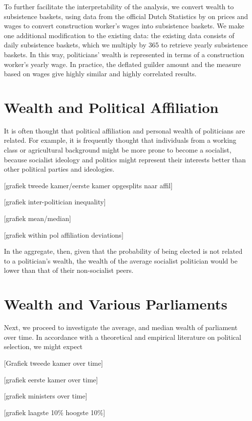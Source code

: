 To further facilitate the interpretability of the analysis, we convert wealth to subsistence baskets, using data from the official Dutch Statistics by \autocite{deZwart2015} on prices and wages to convert construction worker's wages into subsistence baskets. We make one additional modification to the existing data: the existing data consists of daily subsistence baskets, which we multiply by 365 to retrieve yearly subsistence baskets. In this way, politicians' wealth is represented in terms of a construction worker's yearly wage. In practice, the deflated guilder amount and the measure based on wages give highly similar and highly correlated results. 

\section{Wealth and Political Affiliation}
It is often thought that political affiliation and personal wealth of politicians are related. For example, it is frequently thought that individuals from a working class or agricultural background might be more prone to become a socialist, because socialist ideology and politics might represent their interests better than other political parties and ideologies. 


\begin{center}
    
    [grafiek tweede kamer/eerste kamer opgesplits naar affil]
    
    [grafiek inter-politician inequality]
    
    [grafiek mean/median]
    
    [grafiek within pol affiliation deviations]
    
   
\end{center}
In the aggregate, then, given that the probability of being elected is not related to a politician's wealth, the wealth of the average socialist politician would be lower than that of their non-socialist peers. 

\section{Wealth and Various Parliaments}
Next, we proceed to investigate the average, and median wealth of parliament over time. In accordance with a theoretical and empirical literature on political selection, we might expect 

\begin{center}
    [Grafiek tweede kamer over time]
    
    [grafiek eerste kamer over time]
    
    [grafiek ministers over time]
    
    [grafiek laagste 10\% hoogste 10\%]
    
\end{center}

